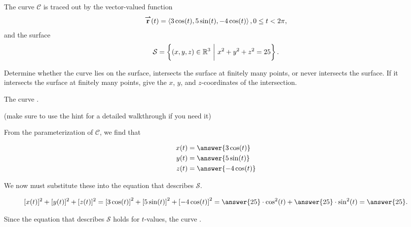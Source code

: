 \documentclass{ximera}
\author{Jim Talamo}
\begin{document}
\begin{exercise}
The curve $\mathcal{C}$ is traced out by the vector-valued function \[{\overset{\boldsymbol{\rightharpoonup}}{\mathbf{r}}}(t) = \left\langle 3\cos(t),5\sin(t),-4\cos(t)\right\rangle, 0 \leq t <2\pi,\] and the surface \[\mathcal{S} = \left\{(x,y,z)\in \mathbb R^3 ~ \bigg| ~ x^2+y^2+z^2 =25\right\}.\]

Determine whether the curve lies on the surface, intersects the surface at finitely many points, or never intersects the surface.  If it intersects the surface at finitely many points, give the $x$, $y$, and $z$-coordinates of the intersection.

The curve .

(make sure to use the hint for a detailed walkthrough if you need it)
\begin{hint}
From the parameterization of $\mathcal{C}$, we find that 

\begin{align*}
x(t)&= \answer{3\cos(t)} \\
y(t)&= \answer{5\sin(t)} \\
z(t)&= \answer{-4\cos(t)} \\
\end{align*}

We now must substitute these into the equation that describes $\mathcal{S}$.

\[
[x(t)]^2+[y(t)]^2+[z(t)]^2 = \left[3\cos(t) \right]^2 + \left[ 5\sin(t)\right]^2 + \left[ -4\cos(t) \right]^2 =\answer{25} \cdot \cos^2(t) + \answer{25} \cdot \sin^2(t) = \answer{25}.
\]

Since the equation that describes $\mathcal{S}$ holds for  $t$-values, the curve .
\end{hint}
\end{exercise}
\end{document}

